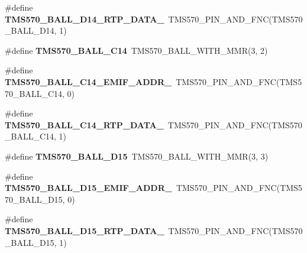 \begin{DoxyCompactItemize}
\item 
\mbox{\label{tms570lc4357-pins_8h_a7dcda5b9bc492c353fba5fffe871bdab}} 
\#define {\bfseries T\+M\+S570\+\_\+\+B\+A\+L\+L\+\_\+\+D14\+\_\+\+R\+T\+P\+\_\+\+D\+A\+T\+A\+\_}~T\+M\+S570\+\_\+\+P\+I\+N\+\_\+\+A\+N\+D\+\_\+\+F\+NC(T\+M\+S570\+\_\+\+B\+A\+L\+L\+\_\+\+D14, 1)
\item 
\mbox{\label{tms570lc4357-pins_8h_ad32eec5a7da1cc504cd15dffe4a2a5a9}} 
\#define {\bfseries T\+M\+S570\+\_\+\+B\+A\+L\+L\+\_\+\+C14}~T\+M\+S570\+\_\+\+B\+A\+L\+L\+\_\+\+W\+I\+T\+H\+\_\+\+M\+MR(3, 2)
\item 
\mbox{\label{tms570lc4357-pins_8h_ac2e9aaded9cd9a9a0625109a22c184b9}} 
\#define {\bfseries T\+M\+S570\+\_\+\+B\+A\+L\+L\+\_\+\+C14\+\_\+\+E\+M\+I\+F\+\_\+\+A\+D\+D\+R\+\_}~T\+M\+S570\+\_\+\+P\+I\+N\+\_\+\+A\+N\+D\+\_\+\+F\+NC(T\+M\+S570\+\_\+\+B\+A\+L\+L\+\_\+\+C14, 0)
\item 
\mbox{\label{tms570lc4357-pins_8h_a21bc8ea1d4bd0de3ec6c099b4eb86ab1}} 
\#define {\bfseries T\+M\+S570\+\_\+\+B\+A\+L\+L\+\_\+\+C14\+\_\+\+R\+T\+P\+\_\+\+D\+A\+T\+A\+\_}~T\+M\+S570\+\_\+\+P\+I\+N\+\_\+\+A\+N\+D\+\_\+\+F\+NC(T\+M\+S570\+\_\+\+B\+A\+L\+L\+\_\+\+C14, 1)
\item 
\mbox{\label{tms570lc4357-pins_8h_ac156db301039beb2b24f9e1f396636c7}} 
\#define {\bfseries T\+M\+S570\+\_\+\+B\+A\+L\+L\+\_\+\+D15}~T\+M\+S570\+\_\+\+B\+A\+L\+L\+\_\+\+W\+I\+T\+H\+\_\+\+M\+MR(3, 3)
\item 
\mbox{\label{tms570lc4357-pins_8h_a0840336fb3d7e47d2c128ccab7c8d997}} 
\#define {\bfseries T\+M\+S570\+\_\+\+B\+A\+L\+L\+\_\+\+D15\+\_\+\+E\+M\+I\+F\+\_\+\+A\+D\+D\+R\+\_}~T\+M\+S570\+\_\+\+P\+I\+N\+\_\+\+A\+N\+D\+\_\+\+F\+NC(T\+M\+S570\+\_\+\+B\+A\+L\+L\+\_\+\+D15, 0)
\item 
\mbox{\label{tms570lc4357-pins_8h_a05161b6f8e426f0c4fc4b1a32a716c28}} 
\#define {\bfseries T\+M\+S570\+\_\+\+B\+A\+L\+L\+\_\+\+D15\+\_\+\+R\+T\+P\+\_\+\+D\+A\+T\+A\+\_}~T\+M\+S570\+\_\+\+P\+I\+N\+\_\+\+A\+N\+D\+\_\+\+F\+NC(T\+M\+S570\+\_\+\+B\+A\+L\+L\+\_\+\+D15, 1)
\item 

\end{DoxyCompactItemize}
